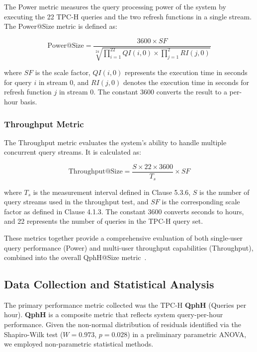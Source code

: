 \documentclass[conference]{IEEEtran}
\begin{document}
The Power metric measures the query processing power of the system by executing the 22 TPC-H queries and the two refresh functions in a single stream. The Power@Size metric is defined as:

\begin{equation}
\text{Power@Size} = \frac{3600 \times SF}{\sqrt[24]{\prod_{i=1}^{22} QI(i,0) \times \prod_{j=1}^{2} RI(j,0)}}
\end{equation}

where $SF$ is the scale factor, $QI(i,0)$ represents the execution time in seconds for query $i$ in stream 0, and $RI(j,0)$ denotes the execution time in seconds for refresh function $j$ in stream 0. The constant 3600 converts the result to a per-hour basis.


\subsubsection{Throughput Metric}

The Throughput metric evaluates the system's ability to handle multiple concurrent query streams. It is calculated as:

\begin{equation}
\text{Throughput@Size} = \frac{S \times 22 \times 3600}{T_s} \times SF
\end{equation}

where $T_s$ is the measurement interval defined in Clause 5.3.6, $S$ is the number of query streams used in the throughput test, and $SF$ is the corresponding scale factor as defined in Clause 4.1.3. The constant 3600 converts seconds to hours, and 22 represents the number of queries in the TPC-H query set.

These metrics together provide a comprehensive evaluation of both single-user query performance (Power) and multi-user throughput capabilities (Throughput), combined into the overall QphH@Size metric~\cite{TPC-H-3.0.1}.


\subsection{Data Collection and Statistical Analysis}

The primary performance metric collected was the TPC-H \textbf{QphH} (Queries per hour). \textbf{QphH} is a composite metric that reflects system query-per-hour performance. Given the non-normal distribution of residuals identified via the Shapiro-Wilk test ($W = 0.973$, $p = 0.028$) in a preliminary parametric ANOVA, we employed non-parametric statistical methods.
\end{document}
